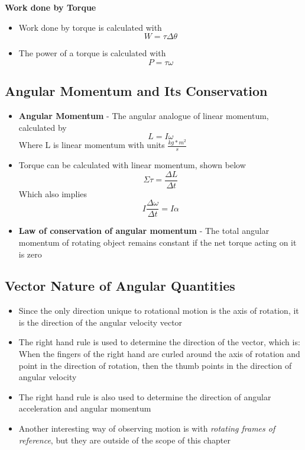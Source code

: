 \textbf{Work done by Torque}
\begin{itemize}
    \item Work done by torque is calculated with \[W=\tau\Delta\theta\]
    \item The power of a torque is calculated with \[P=\tau\omega\]
\end{itemize}

\subsection{Angular Momentum and Its Conservation}
\begin{itemize}
    \item \textbf{Angular Momentum} - The angular analogue of linear momentum, calculated by \[L=I\omega\] Where L is linear momentum with units \(\frac{kg*m^2}{s}\)
    \item Torque can be calculated with linear momentum, shown below \[\Sigma\tau=\frac{\Delta L}{\Delta t}\] Which also implies \[I\frac{\Delta\omega}{\Delta t}=I\alpha\]
    \item \textbf{Law of conservation of angular momentum} - The total angular momentum of rotating object remains constant if the net torque acting on it is zero
\end{itemize}

\subsection{Vector Nature of Angular Quantities}
\begin{itemize}
    \item Since the only direction unique to rotational motion is the axis of rotation, it is the direction of the angular velocity vector
    \item The right hand rule is used to determine the direction of the vector, which is: When the fingers of the right hand are curled around the axis of rotation and point in the direction of rotation, then the thumb points in the direction of angular velocity
    \item The right hand rule is also used to determine the direction of angular acceleration and angular momentum
    \item Another interesting way of observing motion is with \emph{rotating frames of reference}, but they are outside of the scope of this chapter
\end{itemize}

\newpage